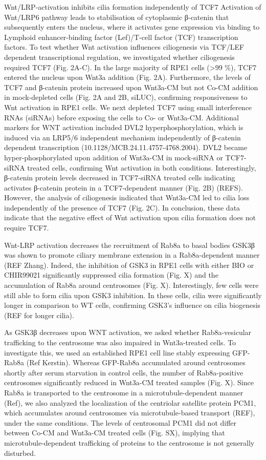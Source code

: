 \documentclass[
  11pt,
]{article}
\begin{document}
Wnt/LRP-activation inhibits cilia formation independently of TCF7
Activation of Wnt/LRP6 pathway leads to stabilisation of cytoplasmic
β-catenin that subsequently enters the nucleus, where it activates gene
expression via binding to Lymphoid enhancer-binding factor (Lef)/T-cell
factor (TCF) transcription factors. To test whether Wnt activation
influences ciliogenesis via TCF/LEF dependent transcriptional
regulation, we investigated whether ciliogenesis required TCF7 (Fig.
2A-C). In the large majority of RPE1 cells (\textgreater99 \%), TCF7
entered the nucleus upon Wnt3a addition (Fig. 2A). Furthermore, the
levels of TCF7 and β-catenin protein increased upon Wnt3a-CM but not
Co-CM addition in mock-depleted cells (Fig. 2A and 2B, siLUC),
confirming responsiveness to Wnt activation in RPE1 cells. We next
depleted TCF7 using small interference RNAs (siRNAs) before exposing the
cells to Co- or Wnt3a-CM. Additional markers for WNT activation included
DVL2 hyperphosphorylation, which is induced via an LRP5/6 independent
mechanism independently of β-catenin dependent transcription
(10.1128/MCB.24.11.4757-4768.2004). DVL2 became hyper-phosphorylated
upon addition of Wnt3a-CM in mock-siRNA or TCF7-siRNA treated cells,
confirming Wnt activation in both conditions. Interestingly, β-catenin
protein levels decreased in TCF7-siRNA treated cells indicating
activates β-catenin protein in a TCF7-dependent manner (Fig. 2B) (REFS).
However, the analysis of ciliogenesis indicated that Wnt3a-CM led to
cilia loss independently of the presence of TCF7 (Fig. 2C). In
conclusion, these data indicate that the negative effect of Wnt
activation upon cilia formation does not require TCF7.

Wnt-LRP activation decreases the recruitment of Rab8a to basal bodies
GSK3β was shown to promote ciliary membrane extension in a
Rab8a-dependent manner (REF Zhang). Indeed, the inhibition of GSK3 in
RPE1 cells with either BIO or CHIR99021 significantly suppressed cilia
formation (Fig. X) and the accumulation of Rab8a around centrosomes
(Fig. X). Interestingly, few cells were still able to form cilia upon
GSK3 inhibition. In these cells, cilia were significantly longer in
comparison to WT cells, confirming GSK3's influence on cilia biogenesis
(REF for longer cilia).

As GSK3β decreases upon WNT activation, we asked whether Rab8a-vesicular
trafficking to the centrosome was also impaired in Wnt3a-treated cells.
To investigate this, we used an established RPE1 cell line stably
expressing GFP-Rab8a (Ref Kerstin). Whereas GFP-Rab8a accumulated around
centrosomes shortly after serum starvation in control cells, the number
of Rab8a-positive centrosomes significantly reduced in Wnt3a-CM treated
samples (Fig. X). Since Rab8a is transported to the centrosome in a
microtubule-dependent manner (Ref), we also analyzed the localization of
the centriolar satellite protein PCM1, which accumulates around
centrosomes via microtubule-based transport (REF), under the same
conditions. The levels of centrosomal PCM1 did not differ between Co-CM
and Wnt3a-CM treated cells (Fig. SX), implying that
microtubule-dependent trafficking of proteins to the centrosome is not
generally disturbed.
\end{document}
